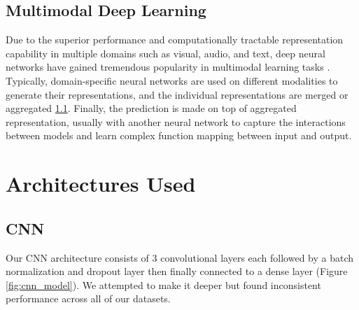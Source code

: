 \documentclass{turabian-thesis}
\begin{document}
\subsection{Multimodal Deep Learning}

Due to the superior performance and computationally tractable representation capability in multiple domains such as visual, audio, and text, deep neural networks have gained tremendous popularity in multimodal learning tasks \cite{kim_multimodal_2018}. Typically, domain-specific neural networks are used on different modalities to generate their representations, and the individual representations are merged or aggregated \ref{}. Finally, the prediction is made on top of aggregated representation, usually with another neural network to capture the interactions between models and learn complex function mapping between input and output.


\section{Architectures Used}

\subsection{CNN}

Our CNN architecture consists of 3 convolutional layers each followed by a batch normalization and dropout layer then finally connected to a dense layer (Figure \ref{fig:cnn_model}). We attempted to make it deeper but found inconsistent performance across all of our datasets.
\end{document}
